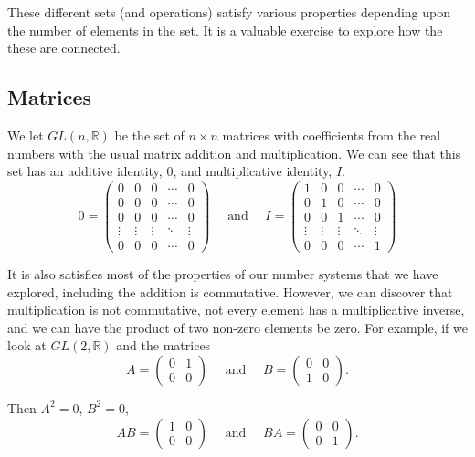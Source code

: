 \documentclass[
]{book}
\theoremstyle{definition}
\theoremstyle{definition}
\theoremstyle{definition}
\theoremstyle{definition}
\theoremstyle{remark}
\begin{document}
These different sets (and operations) satisfy various properties depending upon the number of elements in the set. It is a valuable exercise to explore how the these are connected.

\hypertarget{matrices}{%
\subsection{Matrices}\label{matrices}}

We let \(GL(n,\mathbb{R})\) be the set of \(n\times n\) matrices with coefficients from the real numbers with the usual matrix addition and multiplication. We can see that this set has an additive identity, \(0\), and multiplicative identity, \(I\).
\[0 = \begin{pmatrix}
 0 & 0 & 0 & \cdots & 0 \\
 0 & 0 & 0 & \cdots & 0 \\
 0 & 0 & 0 & \cdots & 0 \\
 \vdots & \vdots & \vdots & \ddots & 
 \vdots \\
 0 & 0 & 0 & \cdots & 0 
\end{pmatrix} \quad \mbox{ and } \quad  I= \begin{pmatrix}
 1 & 0 & 0 & \cdots & 0 \\
 0 & 1 & 0 & \cdots & 0 \\
 0 & 0 & 1 & \cdots & 0 \\
 \vdots & \vdots & \vdots & \ddots & 
 \vdots \\
 0 & 0 & 0 & \cdots & 1 
\end{pmatrix}\]

It is also satisfies most of the properties of our number systems that we have explored, including the addition is commutative. However, we can discover that multiplication is not commutative, not every element has a multiplicative inverse, and we can have the product of two non-zero elements be zero. For example, if we look at \(GL(2,\mathbb{R})\) and the matrices
\[A = \begin{pmatrix}
0 & 1 \\
0 & 0
\end{pmatrix} \quad \mbox{ and } \quad 
B= \begin{pmatrix}
0 & 0 \\
1 & 0
\end{pmatrix}.\]

Then \(A^2=0\), \(B^2=0\),
\[AB=\begin{pmatrix}
1 & 0 \\
0 & 0
\end{pmatrix} \quad \mbox{ and } \quad 
BA= \begin{pmatrix}
0 & 0 \\
0 & 1
\end{pmatrix}.\]
\end{document}
